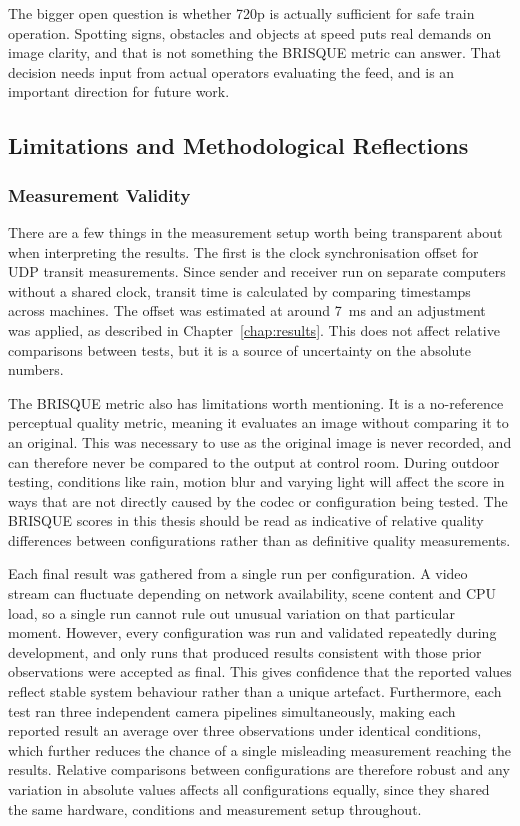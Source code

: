 The bigger open question is whether 720p is actually sufficient for safe train operation. Spotting signs, obstacles and objects at speed puts real demands on image clarity, and that is not something the BRISQUE metric can answer. That decision needs input from actual operators evaluating the feed, and is an important direction for future work.

\subsection{Limitations and Methodological Reflections}\label{subsec:disc_limitations}

\subsubsection{Measurement Validity}\label{subsubsec:meas_validity}

There are a few things in the measurement setup worth being transparent about when interpreting the results. The first is the clock synchronisation offset for UDP transit measurements. Since sender and receiver run on separate computers without a shared clock, transit time is calculated by comparing timestamps across machines. The offset was estimated at around 7~ms and an adjustment was applied, as described in Chapter~\ref{chap:results}. This does not affect relative comparisons between tests, but it is a source of uncertainty on the absolute numbers.
 
The BRISQUE metric also has limitations worth mentioning. It is a no-reference perceptual quality metric, meaning it evaluates an image without comparing it to an original. This was necessary to use as the original image is never recorded, and can therefore never be compared to the output at control room. During outdoor testing, conditions like rain, motion blur and varying light will affect the score in ways that are not directly caused by the codec or configuration being tested. The BRISQUE scores in this thesis should be read as indicative of relative quality differences between configurations rather than as definitive quality measurements.

Each final result was gathered from a single run per configuration. A video stream can fluctuate depending on network availability, scene content and CPU load, so a single run cannot rule out unusual variation on that particular moment. However, every configuration was run and validated repeatedly during development, and only runs that produced results consistent with those prior observations were accepted as final. This gives confidence that the reported values reflect stable system behaviour rather than a unique artefact. Furthermore, each test ran three independent camera pipelines simultaneously, making each reported result an average over three observations under identical conditions, which further reduces the chance of a single misleading measurement reaching the results. Relative comparisons between configurations are therefore robust and any variation in absolute values affects all configurations equally, since they shared the same hardware, conditions and measurement setup throughout.

